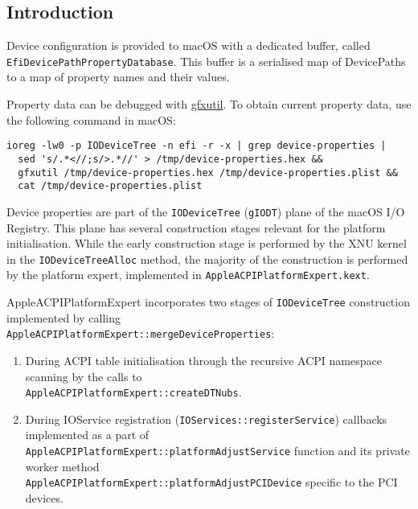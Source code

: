 \documentclass[]{article}
\makeatletter
\providecommand{\tightlist}{%
  \setlength{\itemsep}{0pt}\setlength{\parskip}{0pt}}
\renewcommand{\label}[1]{%
\zref@wrapper@immediate{\oldlabel{#1}}}  %
\makeatother
\begin{document}
\subsection{Introduction}\label{devpropsintro}

Device configuration is provided to macOS with a dedicated buffer,
called \texttt{EfiDevicePathPropertyDatabase}. This buffer is a serialised
map of DevicePaths to a map of property names and their values.

Property data can be debugged with
\href{https://github.com/acidanthera/gfxutil}{gfxutil}.
To obtain current property data, use the following command in macOS:
\begin{lstlisting}[label=gfxutil, style=ocbash]
ioreg -lw0 -p IODeviceTree -n efi -r -x | grep device-properties |
  sed 's/.*<//;s/>.*//' > /tmp/device-properties.hex &&
  gfxutil /tmp/device-properties.hex /tmp/device-properties.plist &&
  cat /tmp/device-properties.plist
\end{lstlisting}

Device properties are part of the \texttt{IODeviceTree} (\texttt{gIODT})
plane of the macOS I/O Registry. This plane has several construction stages
relevant for the platform initialisation. While the early construction
stage is performed by the XNU kernel in the \texttt{IODeviceTreeAlloc}
method, the majority of the construction is performed by the platform expert,
implemented in \texttt{AppleACPIPlatformExpert.kext}.

AppleACPIPlatformExpert incorporates two stages of \texttt{IODeviceTree}
construction implemented by calling \\
\texttt{AppleACPIPlatformExpert::mergeDeviceProperties}:

\begin{enumerate}
  \tightlist
  \item During ACPI table initialisation through the recursive ACPI namespace scanning
  by the calls to \\
  \texttt{AppleACPIPlatformExpert::createDTNubs}.
  \item During IOService registration (\texttt{IOServices::registerService}) callbacks
  implemented as a part of \\
  \texttt{AppleACPIPlatformExpert::platformAdjustService}
  function and its private worker method \\
  \texttt{AppleACPIPlatformExpert::platformAdjustPCIDevice}
  specific to the PCI devices.
\end{enumerate}
\end{document}
